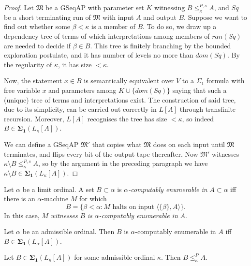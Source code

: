 \documentclass[12pt]{article}
\numberwithin{equation}{section}
\begin{document}
\begin{proof}
Let $\mathfrak{M}$ be a GSeqAP with parameter set $K$ witnessing $B \leq^{P, s}_{\kappa} A$, and $Sq$ be a short terminating run of $\mathfrak{M}$ with input $A$ and output $B$. Suppose we want to find out whether some $\beta < \kappa$ is a member of $B$. To do so, we draw up a dependency tree of terms of which interpretations among members of $ran(Sq)$ are needed to decide if $\beta \in B$. This tree is finitely branching by the bounded exploration postulate, and it has number of levels no more than $dom(Sq)$. By the regularity of $\kappa$, it has size $< \kappa$. 

Now, the statement $x \in B$ is semantically equivalent over $V$ to a $\Sigma_1$ formula with free variable $x$ and parameters among $K \cup \{dom(Sq)\}$ saying that such a (unique) tree of terms and interpretations exist. The construction of said tree, due to its simplicity, can be carried out correctly in $L[A]$ through transfinite recursion. Moreover, $L[A]$ recognises the tree has size $< \kappa$, so indeed $B \in \mathbf{\Sigma_1}(L_{\kappa}[A])$.

We can define a GSeqAP $\mathfrak{M}'$ that copies what $\mathfrak{M}$ does on each input until $\mathfrak{M}$ terminates, and flips every bit of the output tape thereafter. Now $\mathfrak{M}'$ witnesses $\kappa \setminus B \leq^{P, s}_{\kappa} A$, so by the argument in the preceding paragraph we have $\kappa \setminus B \in \mathbf{\Sigma_1}(L_{\kappa}[A])$.
\end{proof}

\begin{defi}
Let $\alpha$ be a limit ordinal. A set $B \subset \alpha$ is $\alpha$\emph{-computably enumerable in} $A \subset \alpha$ iff there is an $\alpha$-machine $M$ for which
\begin{equation*}
    B = \{\beta < \alpha : M \text{ halts on input } \langle \{\beta\}, A \rangle\} \text{.}
\end{equation*}
In this case, $M$ \emph{witnesses} $B$ \emph{is} $\alpha$\emph{-computably enumerable in} $A$.
\end{defi}

\begin{fact}\label{fact272}
Let $\alpha$ be an admissible ordinal. Then $B$ is $\alpha$-computably enumerable in $A$ iff $B \in \mathbf{\Sigma_1}(L_{\alpha}[A])$.
\end{fact}

\begin{lem}\label{lem273}
Let $B \in \mathbf{\Sigma_1}(L_{\kappa}[A])$ for some admissible ordinal $\kappa$. Then $B \leq^P_{\kappa} A$.
\end{lem}
\end{document}
